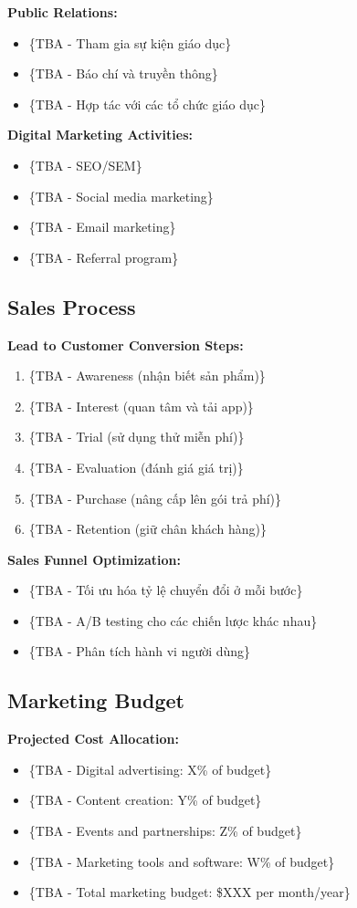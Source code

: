 \textbf{Public Relations:}
\begin{itemize}
    \item \{TBA - Tham gia sự kiện giáo dục\}
    \item \{TBA - Báo chí và truyền thông\}
    \item \{TBA - Hợp tác với các tổ chức giáo dục\}
\end{itemize}

\textbf{Digital Marketing Activities:}
\begin{itemize}
    \item \{TBA - SEO/SEM\}
    \item \{TBA - Social media marketing\}
    \item \{TBA - Email marketing\}
    \item \{TBA - Referral program\}
\end{itemize}

\subsection{Sales Process}
\textbf{Lead to Customer Conversion Steps:}
\begin{enumerate}
    \item \{TBA - Awareness (nhận biết sản phẩm)\}
    \item \{TBA - Interest (quan tâm và tải app)\}
    \item \{TBA - Trial (sử dụng thử miễn phí)\}
    \item \{TBA - Evaluation (đánh giá giá trị)\}
    \item \{TBA - Purchase (nâng cấp lên gói trả phí)\}
    \item \{TBA - Retention (giữ chân khách hàng)\}
\end{enumerate}

\textbf{Sales Funnel Optimization:}
\begin{itemize}
    \item \{TBA - Tối ưu hóa tỷ lệ chuyển đổi ở mỗi bước\}
    \item \{TBA - A/B testing cho các chiến lược khác nhau\}
    \item \{TBA - Phân tích hành vi người dùng\}
\end{itemize}

\subsection{Marketing Budget}
\textbf{Projected Cost Allocation:}
\begin{itemize}
    \item \{TBA - Digital advertising: X\% of budget\}
    \item \{TBA - Content creation: Y\% of budget\}
    \item \{TBA - Events and partnerships: Z\% of budget\}
    \item \{TBA - Marketing tools and software: W\% of budget\}
    \item \{TBA - Total marketing budget: \$XXX per month/year\}
\end{itemize}

